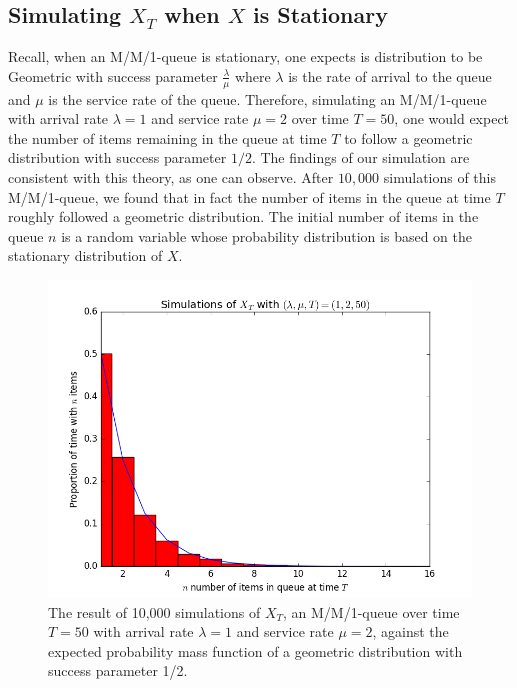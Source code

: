 \documentclass[11pt, oneside]{article}
\begin{document}
\subsection{Simulating $X_T$ when $X$ is Stationary}
Recall, when an M/M/1-queue is stationary, one expects is distribution to be Geometric with success parameter $\frac{\lambda}{\mu}$ where $\lambda$ is the rate of arrival to the queue and $\mu$ is the service rate of the queue. Therefore, simulating an M/M/1-queue with arrival rate $\lambda=1$ and service rate $\mu=2$ over time $T=50$, one would expect the number of items remaining in the queue at time $T$ to follow a geometric distribution with success parameter $1/2$. The findings of our simulation are consistent with this theory, as one can observe. After $10,000$ simulations of this M/M/1-queue, we found that in fact the number of items in the queue at time $T$ roughly followed a geometric distribution. The initial number of items in the queue $n$ is a random variable whose probability distribution is based on the stationary distribution of $X$.
\begin{figure}[H]
\includegraphics[scale=0.7]{simulation_xt}
\caption{The result of 10,000 simulations of $X_T$, an M/M/1-queue over time $T=50$ with arrival rate $\lambda=1$ and service rate $\mu=2$, against the expected probability mass function of a geometric distribution with success parameter 1/2.}
\label{fig:x}
\end{figure}
\end{document}
